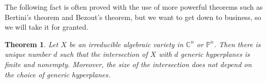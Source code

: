 \documentclass[12pt]{article}
\newtheorem{theorem}{Theorem}[section]
\theoremstyle{definition}
\newtheorem{remark}{Remark}[section]
\newcommand{\C}{\mathbb{C}}
\newcommand{\PP}{\mathbb{P}}
\begin{document}


The following fact is often proved with the use of more powerful 
theorems such as Bertini's theorem and Bezout's theorem, but we want to 
get down to business, so we will take it for granted.

\begin{theorem}
   Let $X$ be an irreducible algebraic variety in $\C^n$ or $\PP^n$. 
   Then there is unique number $d$ such that the intersection of $X$ 
   with $d$ generic hyperplanes is finite and nonempty. Moreover, the 
   size of the intersection does not depend on the choice of generic 
   hyperplanes.
\end{theorem}
\end{document}
